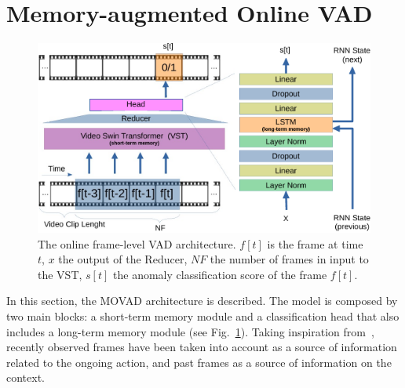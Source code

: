 \section{Memory-augmented Online VAD}
\label{sec:theory}

\fboxsep=1mm%
\fboxrule=1pt%

\begin{figure}[!t]
            \centerline{\includegraphics[clip, width=.9\linewidth]{images/arch-rx-cropped.pdf}}
        \caption{The online frame-level VAD architecture. $f[t]$ is the frame at time $t$, $x$ the output of the Reducer, $NF$ the number of frames in input to the VST, $s[t]$ the anomaly classification score of the frame $f[t]$.\vspace{-5mm}\label{fig:arch}}
\end{figure}

In this section, the MOVAD architecture is described.  
The model is composed by two main blocks: a short-term memory module and a classification head that also includes a long-term  memory module (see Fig.~\ref{fig:arch}). 
Taking inspiration from~\cite{xu2021long}, recently observed frames have been taken into account as a source of information related to the ongoing action, and past frames as a source of information on the context.

